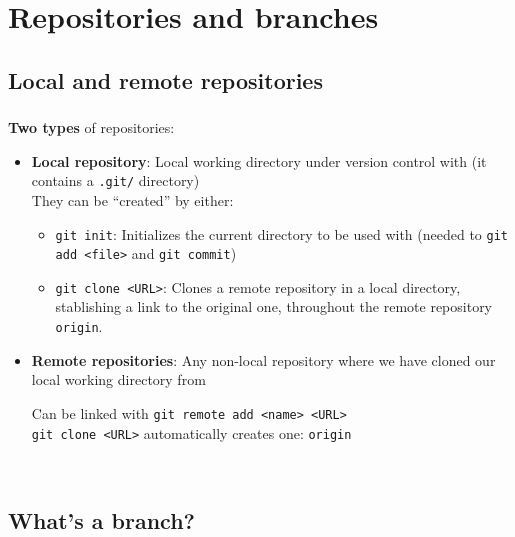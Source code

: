 
\section{Repositories and branches}

\subsection{Local and remote repositories}

\begin{frame}
  \frametitle{\insertsubsection}

  \textbf{Two types} of repositories: \vspacing
  \begin{itemize}
  \item \textbf{Local repository}: Local working directory under
    version control with \git (it contains a \texttt{.git/}
    directory)\\ \vspacing They can be ``created'' by either:\vspacing
    \begin{itemize}
    \item \texttt{git init}: Initializes the current directory to be
      used with \git (needed to \texttt{git add <file>} and
      \texttt{git commit}) \vspacing

    \item \texttt{git clone <URL>}: Clones a remote repository in a
      local directory, stablishing a link to the original one,
      throughout the remote repository \texttt{origin}.
    \end{itemize} \vspacing

  \item \textbf{Remote repositories}: Any non-local repository where
    we have cloned our local working directory from\\
    \vspacing

    Can be linked with \texttt{git remote add <name> <URL>} \\
    \texttt{git clone <URL>} automatically creates one: \texttt{origin}
  \end{itemize}\
\end{frame}


\subsection{What's a branch?}

